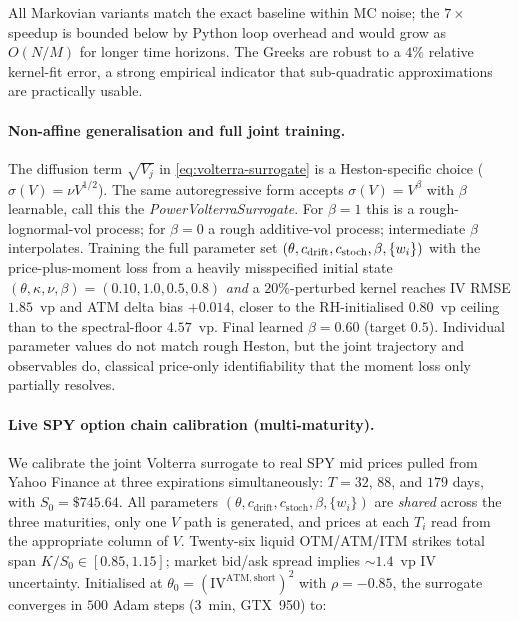 \documentclass[11pt,a4paper]{article}
\begin{document}
All Markovian variants match the exact baseline within MC noise; the
$7\times$ speedup is bounded below by Python loop overhead and would
grow as $O(N/M)$ for longer time horizons. The Greeks are robust to a
$4\%$ relative kernel-fit error, a strong empirical indicator that
sub-quadratic approximations are practically usable.

\paragraph{Non-affine generalisation and full joint training.}
The diffusion term $\sqrt{V_j}$ in \eqref{eq:volterra-surrogate} is a
Heston-specific choice ($\sigma(V) = \nu V^{1/2}$). The same
autoregressive form accepts $\sigma(V) = V^\beta$ with $\beta$
learnable, call this the \emph{PowerVolterraSurrogate}. For
$\beta = 1$ this is a rough-lognormal-vol process; for $\beta = 0$ a
rough additive-vol process; intermediate $\beta$ interpolates.
Training the full parameter set
$(\theta, c_{\rm drift}, c_{\rm stoch}, \beta, \{w_i\})$ with the
price-plus-moment loss from a heavily misspecified initial state
$(\theta, \kappa, \nu, \beta) = (0.10, 1.0, 0.5, 0.8)$ \emph{and} a
$20\%$-perturbed kernel reaches IV RMSE $1.85$~vp and ATM delta bias
$+0.014$, closer to the RH-initialised $0.80$~vp ceiling than to
the spectral-floor $4.57$~vp. Final learned $\beta = 0.60$ (target
$0.5$). Individual parameter values do not match rough Heston, but
the joint trajectory and observables do, classical price-only
identifiability that the moment loss only partially resolves.

\paragraph{Live SPY option chain calibration (multi-maturity).}
We calibrate the joint Volterra surrogate to real SPY mid prices pulled
from Yahoo Finance at three expirations simultaneously: $T = 32$, $88$,
and $179$ days, with $S_0 = \$745.64$. All parameters
$(\theta, c_{\mathrm{drift}}, c_{\mathrm{stoch}}, \beta, \{w_i\})$
are \emph{shared} across the three maturities, only one $V$ path is
generated, and prices at each $T_i$ read from the appropriate column of
$V$. Twenty-six liquid OTM/ATM/ITM strikes total span
$K/S_0 \in [0.85, 1.15]$; market bid/ask spread implies $\sim\!1.4$~vp
IV uncertainty. Initialised at
$\theta_0 = (\mathrm{IV}^{\mathrm{ATM, short}})^2$ with $\rho = -0.85$,
the surrogate converges in $500$ Adam steps ($3$~min, GTX~950) to:
\end{document}
